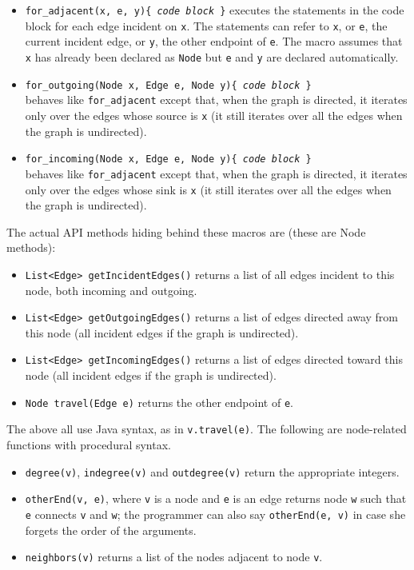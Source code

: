 \begin{itemize}

\item
\texttt{for\_adjacent(x, e, y)\{ \emph{code block} \}}
executes the statements in the code block for each edge incident on \verb$x$.
The statements can refer to \verb$x$, or \verb$e$, the current incident edge,
or \verb$y$, the other endpoint of \verb$e$.
The macro assumes that \texttt{x} has already been declared as \texttt{Node}
but \texttt{e} and \texttt{y} are declared automatically.

\item
\texttt{for\_outgoing(Node x, Edge e, Node y)\{ \emph{code block} \}}\\
behaves like \texttt{for\_adjacent} except that, when the graph is directed,
it iterates only over the edges whose source is \verb$x$ (it still iterates over all the edges when the graph is undirected). 

\item
\texttt{for\_incoming(Node x, Edge e, Node y)\{ \emph{code block} \}}\\
behaves like \texttt{for\_adjacent} except that, when the graph is directed,
it iterates only over the edges whose sink is \verb$x$ (it still iterates over all the edges when the graph is undirected). 

\end{itemize}

The actual API methods hiding behind these macros are (these are Node methods):

\begin{itemize}
\item
\texttt{List<Edge>~getIncidentEdges()} returns a list of all edges incident to this node,
both incoming and outgoing.
\item
\texttt{List<Edge>~getOutgoingEdges()} returns a list of edges directed away
from this node (all incident edges if the graph is undirected).
\item
\texttt{List<Edge>~getIncomingEdges()} returns a list of edges directed toward
this node (all incident edges if the graph is undirected).
\item
\texttt{Node~travel(Edge~e)} returns the other endpoint of \texttt{e}.
\end{itemize}

The above all use Java syntax, as in \texttt{v.travel(e)}.
The following are node-related functions with procedural syntax.

\begin{itemize}
\item \texttt{degree(v)}, \texttt{indegree(v)} and \texttt{outdegree(v)} return the appropriate
integers.
\item \texttt{otherEnd(v, e)}, where \texttt{v} is a node and \texttt{e} is an edge
returns node \texttt{w} such that \texttt{e} connects \texttt{v} and \texttt{w};
the programmer can also say \texttt{otherEnd(e, v)} in case she forgets the order
of the arguments.
\item \texttt{neighbors(v)} returns a list of the nodes adjacent to node \texttt{v}.
\end{itemize}

